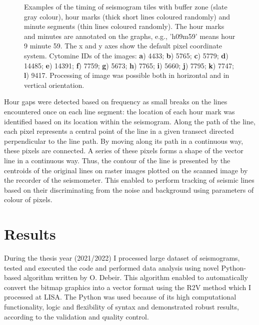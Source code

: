 \documentclass[a4paper,english,12pt]{article}
\begin{document}
\begin{figure}[H]
\begin{subfigure}{0.24\textwidth}
		\caption{}
	\end{subfigure}
\caption{Examples of the timing of seismogram tiles with buffer zone (slate gray colour), hour marks (thick short lines coloured randomly) and minute segments (thin lines coloured randomly). The hour marks and minutes are annotated on the graphs, e.g., 'h09m59' means hour 9 minute 59. The x and y axes show the default pixel coordinate system. Cytomine IDs of the images: \textbf{a}) 4433; \textbf{b}) 5765; \textbf{c}) 5779; \textbf{d}) 14485; \textbf{e}) 14391; \textbf{f}) 7759; \textbf{g}) 5673; \textbf{h}) 7765; \textbf{i}) 5660; \textbf{j}) 7795; \textbf{k}) 7747; \textbf{l}) 9417. Processing of image was possible both in horizontal and in vertical orientation.} \label{fig:08}
\end{figure}

Hour gaps were detected based on frequency as small breaks on the lines encountered once on each line segment: the location of each hour mark was identified based on its location within the seismogram. Along the path of the line, each pixel represents a central point of the line in a given transect directed perpendicular to the line path. By moving along its path in a continuous way, these pixels are connected. A series of these pixels forms a shape of the vector line in a continuous way. Thus, the contour of the line is presented by the centroids of the original lines on raster images plotted on the scanned image by the recorder of the seismometer. This enabled to perform tracking of seismic lines based on their discriminating from the noise and background using parameters of colour of pixels. 

\section{Results}
During the  thesis year (2021/2022) I processed large dataset of seismograms, tested and executed the code and performed data analysis using novel Python-based algorithm written by O. Debeir. This algorithm enabled to automatically convert the bitmap graphics into a vector format using the R2V method which I processed at LISA. The Python was used because of its high computational functionality, logic and flexibility of syntax \cite{van1995python} and demonstrated robust results, according to the validation and quality control. 
\end{document}
